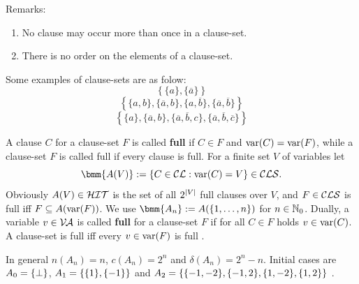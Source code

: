 \documentclass[12pt]{book}
\begin{document}
Remarks:
\begin{enumerate}
      \item No clause may occur more than once in a clause-set.
      \item There is no order on the elements of a clause-set.
\end{enumerate}
\begin{examp}\label{exp:cls}
      Some examples of clause-sets are as folow:
      $$\left\{\{a\}, \{\overline{a}\}\right\}$$
      $$\left\{\{a,b\}, \{\overline{a},b\}, \{a, \overline{b}\}, \{\overline{a},\overline{b}\}\right\}$$
      $$\left\{\{a\}, \{\overline{a},b\}, \{\overline{a}, \overline{b}, c\}, \{\overline{a}, \overline{b}, \overline{c}\}\right\}$$
\end{examp}
\begin{defi}\label{def:fullcls}
      A clause $C$  for a clause-set $F$ is called \textbf{full} if $C \in F$ and $\operatorname{var}(C) = \operatorname{var}(F)$, while a clause-set 
	  $F$ is called full if every clause is full. For a finite set $V$ of variables let
      \begin{displaymath}
      \bmm{A(V)} := \set{C \in \Cl : \var(C) = V} \in \Cls.
      \end{displaymath}
      Obviously $A(V) \in \mathcal{HIT}$ is the set of all $2^{\lvert V \rvert}$ full clauses over $V$, and $F \in \mathcal{CLS}$ is full iff 
	  $F \subseteq A(\operatorname{var}(F))$. We use $\bmm{A_n} := A(\tb 1n)$ for $n \in \mathbb{N}_0$. Dually, a variable $v \in \mathcal{V\hspace{-0.1em}A}$ is called 
	  \textbf{full} for a clause-set $F$ if for all $C \in F$ holds $v \in \operatorname{var}(C)$. A clause-set is full iff every 
	  $v \in \operatorname{var}(F)$ is full \cite{h9}.
\end{defi}

\begin{examp}\label{exp:An}
  In general $n(A_n) = n$, $c(A_n) = 2^n$ and $\delta(A_n) = 2^n-n$. Initial cases are $A_0 = \{ \bot \}$, $A_1 = \{ \{ 1 \},\{ -1 \} \}$ 
  and $A_2 = \{ \{ -1,-2 \},\{ -1,2 \},\{ 1,-2 \},\{ 1,2 \} \}$ \cite{h12}.
\end{examp}
\end{document}
